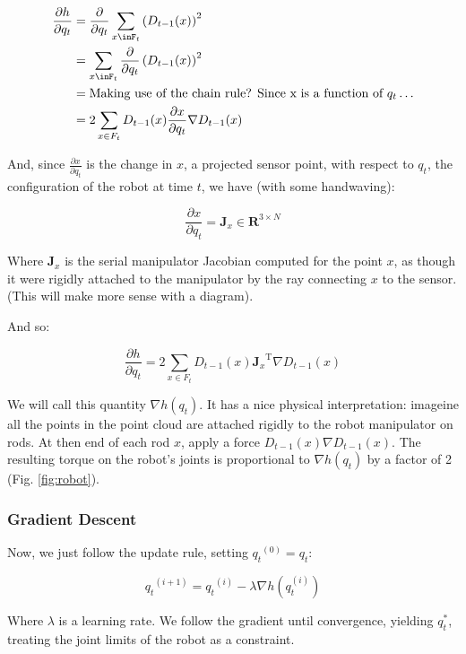 \documentclass{article}
\begin{document}
\newcommand{\ddq}{\frac{\partial}{\partial q_t}}
\newcommand{\dxdq}{\frac{\partial x}{\partial q_t}}

\begin{align} 
\frac{\partial{h}}{\partial{q_t}} &= \ddq  \sum_{x \inF_t}\left(D_{t-1}(x)\right) ^2 
\\ &= \sum_{x \inF_t} \ddq \left(D_{t-1}(x)\right) ^2  
\\ &=\text{Making use of the chain rule? Since x is a function of~} q_t \ldots
\\ &= 2\sum_{x \in F_t} D_{t-1}(x) \dxdq \nabla D_{t-1}(x)
\end{align}

And, since $\dxdq$ is the change in $x$, a projected sensor point, with respect
to $q_t$, the configuration of the robot at time $t$, we have (with some
handwaving):

$$ \dxdq = \mathbf{J}_x \in \mathbf{R}^{3 \times N}$$

Where $\mathbf{J}_x$ is the serial manipulator Jacobian computed for the point
$x$, as though it were rigidly attached to the manipulator by the ray connecting
$x$ to the sensor. (This will make more sense with a diagram).

And so:

$$ \frac{\partial{h}}{\partial{q_t}} = 2\sum_{x \in F_t} D_{t-1}(x)
{\mathbf{J}_x}^{\text{T}} \nabla D_{t-1}(x) $$

\noindent We will call this quantity $\nabla h(q_t)$. It has a nice physical
interpretation: imageine all the points in the point cloud are attached rigidly
to the robot manipulator on rods. At then end of each rod $x$, apply a force
$D_{t - 1}(x) \nabla D_{t -1} (x)$. The resulting torque on the robot's joints
is proportional to $\nabla h(q_t)$ by a factor of 2 (Fig. \ref{fig:robot}).

\subsubsection{Gradient Descent}

Now, we just follow the update rule, setting ${q_t}^{(0)} = q_t$:

$$ {q_t}^{(i + 1)} = {q_t}^{(i)} - \lambda \nabla h(q_t^{(i)}) $$

\noindent Where $\lambda$ is a learning rate. We follow the gradient until
convergence, yielding $q^*_t$, treating the joint limits of the robot as a
constraint.
\end{document}
